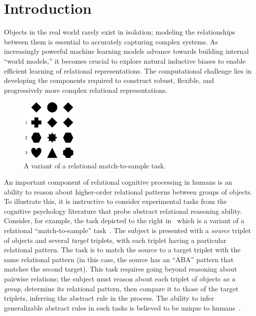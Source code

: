 \section{Introduction}\label{sec:intro}

Objects in the real world rarely exist in isolation; 
modeling the relationships between them is essential to accurately capturing complex systems. As increasingly powerful machine learning models advance towards building internal ``world models,'' it becomes crucial to explore natural inductive biases to enable efficient learning of relational representations. The computational challenge lies in developing the components required to construct robust, flexible, and progressively more complex relational representations.

\begin{figure}
    \vskip-10pt
    \includegraphics[width=0.24\textwidth]{figs/triplet_rmts_fig.pdf}
    \caption{A variant of a relational match-to-sample task.}\label{fig:rmts_example}
    \vskip-10pt
\end{figure}
An important component of relational cognitive processing in humans is an ability to reason about higher-order relational patterns between groups of objects. To illustrate this, it is instructive to consider experimental tasks from the cognitive psychology literature that probe abstract relational reasoning ability. Consider, for example, the task depicted to the right in~ which is a variant of a relational ``match-to-sample'' task~\citep{ferster1960intermittent, webbEmergentSymbols2021}. The subject is presented with a \textit{source} triplet of objects and several \textit{target} triplets, with each triplet having a particular relational pattern. The task is to match the source to a target triplet with the same relational pattern (in this case, the source has an ``ABA'' pattern that matches the second target).
This task requires going beyond reasoning about pairwise relations; the subject must reason about each triplet of objects \textit{as a group}, determine its relational pattern, then compare it to those of the target triplets, inferring the abstract rule in the process.
The ability to infer generalizable abstract rules in such tasks is believed to be unique to humans~\citep{fagot2001discriminating}.


